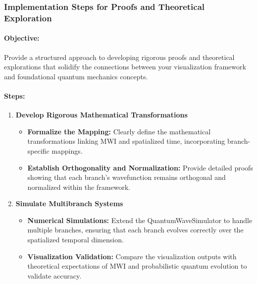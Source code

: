 \documentclass[12pt]{article}
\begin{document}
\subsubsection{Implementation Steps for Proofs and Theoretical Exploration}
\paragraph{Objective:} Provide a structured approach to developing rigorous proofs and theoretical explorations that solidify the connections between your visualization framework and foundational quantum mechanics concepts.

\paragraph{Steps:}
\begin{enumerate}
    \item \textbf{Develop Rigorous Mathematical Transformations}
    \begin{itemize}
        \item \textbf{Formalize the Mapping:} Clearly define the mathematical transformations linking MWI and spatialized time, incorporating branch-specific mappings.
        
        \item \textbf{Establish Orthogonality and Normalization:} Provide detailed proofs showing that each branch’s wavefunction remains orthogonal and normalized within the framework.
    \end{itemize}
    
    \item \textbf{Simulate Multibranch Systems}
    \begin{itemize}
        \item \textbf{Numerical Simulations:} Extend the QuantumWaveSimulator to handle multiple branches, ensuring that each branch evolves correctly over the spatialized temporal dimension.
        
        \item \textbf{Visualization Validation:} Compare the visualization outputs with theoretical expectations of MWI and probabilistic quantum evolution to validate accuracy.
    \end{itemize}
    

\end{enumerate}
\end{document}
